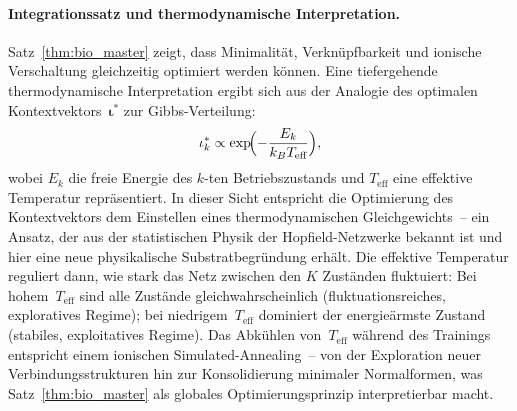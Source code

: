﻿\documentclass[12pt, a4paper, openany]{report}
\begin{document}
\paragraph{Integrationssatz und thermodynamische Interpretation.}
Satz~\ref{thm:bio_master} zeigt, dass Minimalität, Verknüpfbarkeit und
ionische Verschaltung gleichzeitig optimiert werden können.  Eine
tiefergehende thermodynamische Interpretation ergibt sich aus der Analogie
des optimalen Kontextvektors~$\bm{\iota}^*$ zur Gibbs-Verteilung:
\[
  \iota_k^* \propto \exp\!\Bigl(-\frac{E_k}{k_B T_{\text{eff}}}\Bigr),
\]
wobei $E_k$ die freie Energie des $k$-ten Betriebszustands und
$T_{\text{eff}}$ eine effektive Temperatur repräsentiert.  In dieser Sicht
entspricht die Optimierung des Kontextvektors dem Einstellen eines
thermodynamischen Gleichgewichts~-- ein Ansatz, der aus der statistischen
Physik der Hopfield-Netzwerke \cite{goodfellow16} bekannt ist und
hier eine neue physikalische Substratbegründung erhält.
Die effektive Temperatur reguliert dann, wie stark das Netz zwischen den
$K$ Zuständen fluktuiert: Bei hohem~$T_{\text{eff}}$ sind alle Zustände
gleichwahrscheinlich (fluktuationsreiches, exploratives Regime); bei
niedrigem~$T_{\text{eff}}$ dominiert der energieärmste Zustand (stabiles,
exploitatives Regime).  Das Abkühlen von~$T_{\text{eff}}$ während des
Trainings entspricht einem ionischen Simulated-Annealing~-- von der Exploration
neuer Verbindungsstrukturen hin zur Konsolidierung minimaler Normalformen, was
Satz~\ref{thm:bio_master} als globales Optimierungsprinzip interpretierbar macht.
\end{document}
